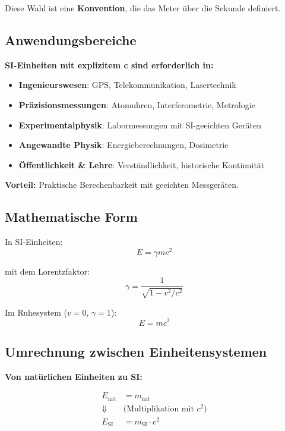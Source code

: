 	Diese Wahl ist eine \textbf{Konvention}, die das Meter über die Sekunde definiert.
	
	\subsection{Anwendungsbereiche}
	
	\textbf{SI-Einheiten mit explizitem c sind erforderlich in:}
	
	\begin{itemize}
		\item \textbf{Ingenieurswesen}: GPS, Telekommunikation, Lasertechnik
		\item \textbf{Präzisionsmessungen}: Atomuhren, Interferometrie, Metrologie
		\item \textbf{Experimentalphysik}: Labormessungen mit SI-geeichten Geräten
		\item \textbf{Angewandte Physik}: Energieberechnungen, Dosimetrie
		\item \textbf{Öffentlichkeit \& Lehre}: Verständlichkeit, historische Kontinuität
	\end{itemize}
	
	\textbf{Vorteil:} Praktische Berechenbarkeit mit geeichten Messgeräten.
	
	\subsection{Mathematische Form}
	
	In SI-Einheiten:
	\begin{equation}
		E = \gamma m c^2
	\end{equation}
	
	mit dem Lorentzfaktor:
	\begin{equation}
		\gamma = \frac{1}{\sqrt{1 - v^2/c^2}}
	\end{equation}
	
	Im Ruhesystem ($v=0$, $\gamma=1$):
	\begin{equation}
		E = mc^2
	\end{equation}
	
	\subsection{Umrechnung zwischen Einheitensystemen}
	
	\textbf{Von natürlichen Einheiten zu SI:}
	
	\begin{align}
		E_{\text{nat}} &= m_{\text{nat}} \\
		\Downarrow \quad &\text{(Multiplikation mit } c^2\text{)} \\
		E_{\text{SI}} &= m_{\text{SI}} \cdot c^2
	\end{align}
	
